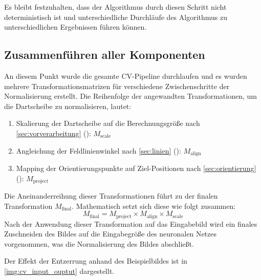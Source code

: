 
Es bleibt festzuhalten, dass der Algorithmus durch diesen Schritt nicht deterministisch ist und unterschiedliche Durchläufe des Algorithmus zu unterschiedlichen Ergebnissen führen können.

\subsection{Zusammenführen aller Komponenten}
\label{sec:zusammenfuehrung_aller_komponenten_cv}

An diesem Punkt wurde die gesamte CV-Pipeline durchlaufen und es wurden mehrere Transformationsmatrizen für verschiedene Zwischenschritte der Normalisierung erstellt. Die Reihenfolge der angewandten Transformationen, um die Dartscheibe zu normalisieren, lautet:

\begin{enumerate}
    \item Skalierung der Dartscheibe auf die Berechnungsgröße nach \autoref{sec:vorverarbeitung} (): $M_\text{scale}$
    \item Angleichung der Feldlinienwinkel nach \autoref{sec:linien} (): $M_\text{align}$
    \item Mapping der Orientierungspunkte auf Ziel-Positionen nach \autoref{sec:orientierung} (): $M_\text{project}$
\end{enumerate}

Die Aneinanderreihung dieser Transformationen führt zu der finalen Transformation $M_\text{final}$. Mathematisch setzt sich diese wie folgt zusammen:
\[ M_\text{final} = M_\text{project} \times M_\text{align} \times M_\text{scale} \]
Nach der Anwendung dieser Transformation auf das Eingabebild wird ein finales Zuschneiden des Bildes auf die Eingabegröße des neuronalen Netzes vorgenommen, was die Normalisierung des Bildes abschließt.

Der Effekt der Entzerrung anhand des Beispielbildes ist in \autoref{img:cv_input_ouptut} dargestellt.


